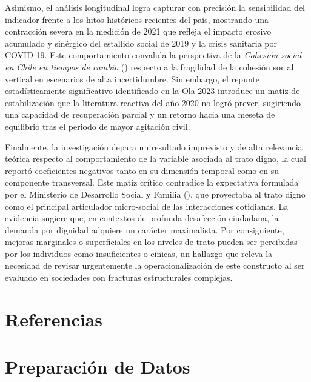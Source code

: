 \documentclass[
  spanish,
  a4paper,
  oneside]{scrbook}
\begin{document}
Asimismo, el análisis longitudinal logra capturar con precisión la
sensibilidad del indicador frente a los hitos históricos recientes del
país, mostrando una contracción severa en la medición de 2021 que
refleja el impacto erosivo acumulado y sinérgico del estallido social de
2019 y la crisis sanitaria por COVID-19. Este comportamiento convalida
la perspectiva de la \emph{{Cohesión social en Chile en tiempos de
cambio}} () respecto a la fragilidad
de la cohesión social vertical en escenarios de alta incertidumbre. Sin
embargo, el repunte estadísticamente significativo identificado en la
Ola 2023 introduce un matiz de estabilización que la literatura reactiva
del año 2020 no logró prever, sugiriendo una capacidad de recuperación
parcial y un retorno hacia una meseta de equilibrio tras el periodo de
mayor agitación civil.

Finalmente, la investigación depara un resultado imprevisto y de alta
relevancia teórica respecto al comportamiento de la variable asociada al
trato digno, la cual reportó coeficientes negativos tanto en su
dimensión temporal como en su componente transversal. Este matiz crítico
contradice la expectativa formulada por el Ministerio de Desarrollo
Social y Familia
(),
que proyectaba al trato digno como el principal articulador micro-social
de las interacciones cotidianas. La evidencia sugiere que, en contextos
de profunda desafección ciudadana, la demanda por dignidad adquiere un
carácter maximalista. Por consiguiente, mejoras marginales o
superficiales en los niveles de trato pueden ser percibidas por los
individuos como insuficientes o cínicas, un hallazgo que releva la
necesidad de revisar urgentemente la operacionalización de este
constructo al ser evaluado en sociedades con fracturas estructurales
complejas.


\chapter{Referencias}\label{referencias}

\cleardoublepage
{}
{}
\appendix

\chapter{Preparación de Datos}\label{preparaciuxf3n-de-datos}
\end{document}
